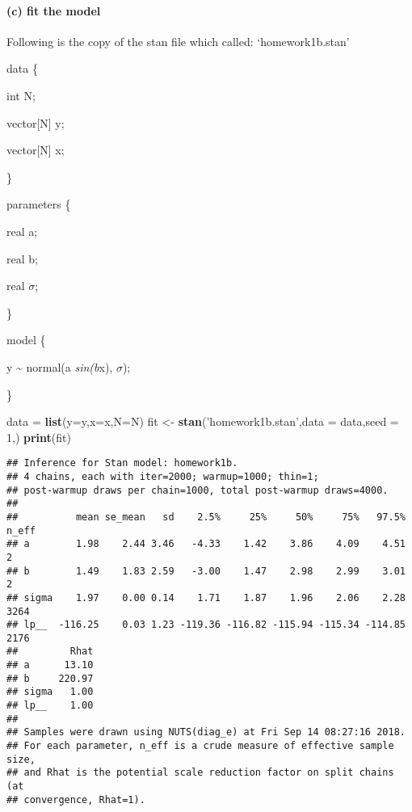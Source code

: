 \documentclass[]{article}
\newenvironment{Shaded}{\begin{snugshade}}{\end{snugshade}}
\newcommand{\KeywordTok}[1]{\textcolor[rgb]{0.13,0.29,0.53}{\textbf{#1}}}
\newcommand{\DataTypeTok}[1]{\textcolor[rgb]{0.13,0.29,0.53}{#1}}
\newcommand{\DecValTok}[1]{\textcolor[rgb]{0.00,0.00,0.81}{#1}}
\newcommand{\StringTok}[1]{\textcolor[rgb]{0.31,0.60,0.02}{#1}}
\newcommand{\NormalTok}[1]{#1}
\let\oldparagraph\paragraph
\renewcommand{\paragraph}[1]{\oldparagraph{#1}\mbox{}}
\begin{document}
\paragraph{(c) fit the model}\label{c-fit-the-model}

Following is the copy of the stan file which called: `homework1b.stan'

data \{

int N;

vector{[}N{]} y;

vector{[}N{]} x;

\}

parameters \{

real a;

real b;

real \(\sigma\);

\}

model \{

y \textasciitilde{} normal(a \emph{sin(b}x), \(\sigma\));

\}

\begin{Shaded}
\begin{Highlighting}[]
\NormalTok{data =}\StringTok{ }\KeywordTok{list}\NormalTok{(}\DataTypeTok{y=}\NormalTok{y,}\DataTypeTok{x=}\NormalTok{x,}\DataTypeTok{N=}\NormalTok{N)}
\NormalTok{fit <-}\StringTok{ }\KeywordTok{stan}\NormalTok{(}\StringTok{'homework1b.stan'}\NormalTok{,}\DataTypeTok{data =}\NormalTok{ data,}\DataTypeTok{seed =} \DecValTok{1}\NormalTok{,)}
\KeywordTok{print}\NormalTok{(fit)}
\end{Highlighting}
\end{Shaded}

\begin{verbatim}
## Inference for Stan model: homework1b.
## 4 chains, each with iter=2000; warmup=1000; thin=1; 
## post-warmup draws per chain=1000, total post-warmup draws=4000.
## 
##          mean se_mean   sd    2.5%     25%     50%     75%   97.5% n_eff
## a        1.98    2.44 3.46   -4.33    1.42    3.86    4.09    4.51     2
## b        1.49    1.83 2.59   -3.00    1.47    2.98    2.99    3.01     2
## sigma    1.97    0.00 0.14    1.71    1.87    1.96    2.06    2.28  3264
## lp__  -116.25    0.03 1.23 -119.36 -116.82 -115.94 -115.34 -114.85  2176
##         Rhat
## a      13.10
## b     220.97
## sigma   1.00
## lp__    1.00
## 
## Samples were drawn using NUTS(diag_e) at Fri Sep 14 08:27:16 2018.
## For each parameter, n_eff is a crude measure of effective sample size,
## and Rhat is the potential scale reduction factor on split chains (at 
## convergence, Rhat=1).
\end{verbatim}
\end{document}
